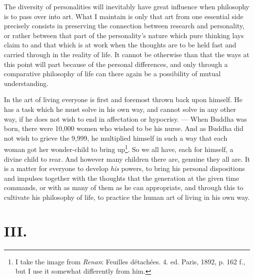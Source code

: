 \documentclass[12pt,a4paper,openany]{book}
\newcommand{\opage}[1]{\marginnote{\footnotesize\textit{[#1]}}}
\begin{document}
The diversity of personalities will inevitably have great
influence when philosophy is to pass over into art. What
I maintain is only that art from one essential side precisely
consists in preserving the connection between research and
personality, or rather between that part of the personality's
nature which pure thinking lays claim to and that
which is at work when the thoughts are to be held fast and carried through in
the reality of life. It cannot be otherwise than that the ways
at this point will part because of the personal
differences, and only through a comparative
philosophy of life can there again be a possibility of mutual understanding.

In the art of living everyone is first and foremost thrown back upon
himself. He has a task which he must solve in his own way, and
cannot solve in any other way, if he does not wish to end
in affectation or hypocrisy. --- When Buddha was born, there were
10,000 women who wished to be his nurse. And as Buddha did not
wish to grieve the 9,999, he multiplied himself
in such a way that each woman got her wonder-child to bring up\footnote{I take the image from \emph{Renan}: Feuilles détachées. 4. ed. Paris,
1892, p. 162 f., but I use it somewhat differently from him.}.
So we all have, each for himself, a divine child to rear. And
however many children there are, genuine they all are. It is a matter
for everyone to develop \emph{his} powers, to bring his personal
dispositions and impulses together with the thoughts that the generation
at the given time commands, or with as many of them as he
can appropriate, and through this to cultivate his philosophy of life, to practice
the human art of living in his own way.

\opage{189}
\section*{III.}
\end{document}
